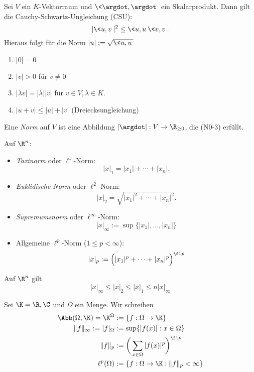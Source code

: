 \begin{st}
	Sei $V$ ein $K$-Vektorraum und $\<\argdot, \argdot\>$ ein Skalarprodukt.
	Dann gilt die Cauchy-Schwartz-Ungleichung (CSU):
	\[
		|\<u,v\>|^2 \le \<u,u\> \<v,v\>.
	\]
	Hieraus folgt für die Norm $|u| := \sqrt{\<u,u\>}$
	\begin{enumerate}[({N}1),start=0]
		\item
			$|0| = 0$
		\item
			$|v| > 0$ für  $v\neq 0$
		\item
			$|\lambda v| = |\lambda| |v|$ für $v \in V, \lambda \in K$.
		\item
			$|u+v| \le |u| + |v|$ (Dreiecksungleichung)
	\end{enumerate}
\end{st}

\begin{df}
	Eine \emph{Norm} auf $V$ ist eine Abbildung $|\argdot| : V \to \R_{\ge 0}$, die (N0-3) erfüllt.
\end{df}

\begin{ex}
	Auf $\R^n$:
	\begin{itemize}
		\item
			\emph{Taxinorm} oder $\ell^1$-Norm:
			\[
				|x|_1 = |x_1| + \dotsb + |x_n|.
			\]
		\item
			\emph{Euklidische Norm} oder $\ell^2$-Norm:
			\[
				|x|_2 = \sqrt{|x_1|^2 + \dotsb + |x_n|^2}.
			\]
		\item
			\emph{Supremumsnorm} oder $\ell^\infty$-Norm:
			\[
				|x|_\infty := \sup \{ |x_1|, \dotsc, |x_n| \}
			\]
		\item
			Allgemeine $\ell^p$-Norm ($1\le p < \infty$):
			\[
				|x|_p := \Big( |x_1|^p + \dotsb + |x_n|^p \Big)^{\f 1p}
			\]
	\end{itemize}
	\begin{note}
		Auf $\R^n$ gilt
		\[
			|x|_\infty
			\le |x|_2
			\le |x|_1
			\le n |x|_\infty
		\]
	\end{note}
\end{ex}

\begin{ex}
	Sei $\K = \R, \C$ und $\Omega$ ein Menge.
	Wir schreiben
	\begin{align*}
		\Abb(\Omega, \K) = \K^\Omega &:= \{f : \Omega \to \K\} \\
		\|f\|_{\infty} := |f|_\Omega &:= \sup \{ |f(x)| : x \in \Omega \} \\
		\|f\|_{p} &:= \bigg( \sum_{x\in\Omega} |f(x)|^p \bigg)^{\f 1p} \\
		\ell^p(\Omega) &:= \{ f : \Omega \to \K : \|f\|_p < \infty \}
	\end{align*}
\end{ex}

